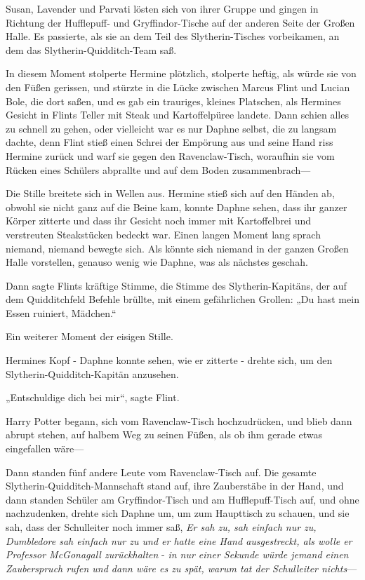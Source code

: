{Susan, Lavender und Parvati lösten sich von ihrer Gruppe und gingen in Richtung der Hufflepuff- und Gryffindor-Tische auf der anderen Seite der Großen Halle. Es passierte, als sie an dem Teil des Slytherin-Tisches vorbeikamen, an dem das Slytherin-Quidditch-Team saß.

In diesem Moment stolperte Hermine plötzlich, stolperte heftig, als würde sie von den Füßen gerissen, und stürzte in die Lücke zwischen Marcus Flint und Lucian Bole, die dort saßen, und es gab ein trauriges, kleines Platschen, als Hermines Gesicht in Flints Teller mit Steak und Kartoffelpüree landete. Dann schien alles zu schnell zu gehen, oder vielleicht war es nur Daphne selbst, die zu langsam dachte, denn Flint stieß einen Schrei der Empörung aus und seine Hand riss Hermine zurück und warf sie gegen den Ravenclaw-Tisch, woraufhin sie vom Rücken eines Schülers abprallte und auf dem Boden zusammenbrach—

Die Stille breitete sich in Wellen aus. Hermine stieß sich auf den Händen ab, obwohl sie nicht ganz auf die Beine kam, konnte Daphne sehen, dass ihr ganzer Körper zitterte und dass ihr Gesicht noch immer mit Kartoffelbrei und verstreuten Steakstücken bedeckt war. Einen langen Moment lang sprach niemand, niemand bewegte sich. Als könnte sich niemand in der ganzen Großen Halle vorstellen, genauso wenig wie Daphne, was als nächstes geschah.

Dann sagte Flints kräftige Stimme, die Stimme des Slytherin-Kapitäns, der auf dem Quidditchfeld Befehle brüllte, mit einem gefährlichen Grollen: „Du hast mein Essen ruiniert, Mädchen.“

Ein weiterer Moment der eisigen Stille.

Hermines Kopf - Daphne konnte sehen, wie er zitterte - drehte sich, um den Slytherin-Quidditch-Kapitän anzusehen.

„Entschuldige dich bei mir“, sagte Flint.

Harry Potter begann, sich vom Ravenclaw-Tisch hochzudrücken, und blieb dann abrupt stehen, auf halbem Weg zu seinen Füßen, als ob ihm gerade etwas eingefallen wäre—

Dann standen fünf andere Leute vom Ravenclaw-Tisch auf. Die gesamte Slytherin-Quidditch-Mannschaft stand auf, ihre Zauberstäbe in der Hand, und dann standen Schüler am Gryffindor-Tisch und am Hufflepuff-Tisch auf, und ohne nachzudenken, drehte sich Daphne um, um zum Haupttisch zu schauen, und sie sah, dass der Schulleiter noch immer saß, \emph{Er sah zu, sah einfach nur zu, Dumbledore sah einfach nur zu und er hatte eine Hand ausgestreckt, als wolle er Professor McGonagall zurückhalten} - \emph{in nur einer Sekunde würde jemand einen Zauberspruch rufen und dann wäre es zu spät, warum tat der Schulleiter nichts}—

}
